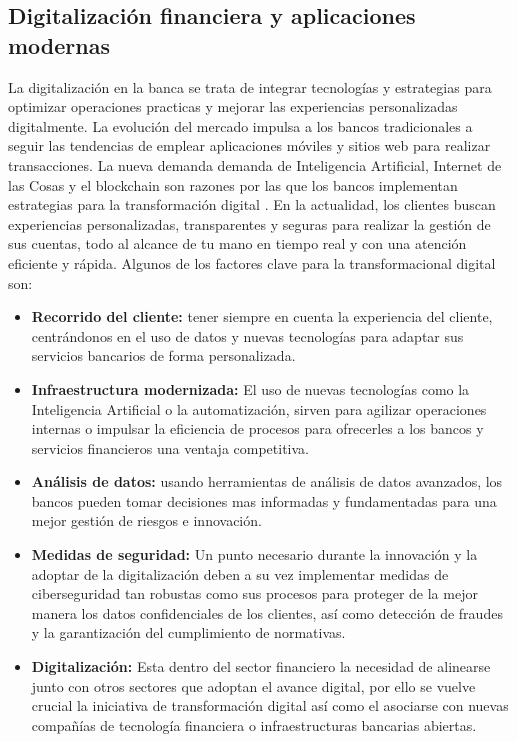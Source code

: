 \subsection{Digitalización financiera y aplicaciones modernas}
La digitalización en la banca se trata de integrar tecnologías y estrategias para optimizar operaciones practicas y mejorar las experiencias personalizadas digitalmente. 
La evolución del mercado impulsa a los bancos tradicionales a seguir las tendencias de emplear aplicaciones móviles y sitios web para realizar transacciones. La nueva 
demanda demanda de Inteligencia Artificial, Internet de las Cosas y el blockchain son razones por las que los bancos implementan estrategias para la transformación digital \cite{IBM Banca}.
En la actualidad, los clientes buscan experiencias personalizadas, transparentes y seguras para realizar la gestión de sus cuentas, todo al alcance de tu mano en tiempo 
real y con una atención eficiente y rápida.
Algunos de los factores clave para la transformacional digital son:
\begin{itemize}
    \item \textbf{Recorrido del cliente:} tener siempre en cuenta la experiencia del cliente, centrándonos en el uso de datos y nuevas tecnologías para adaptar sus servicios bancarios de forma personalizada.
    \item \textbf{Infraestructura modernizada:} El uso de nuevas tecnologías como la Inteligencia Artificial o la automatización, sirven para agilizar operaciones internas o impulsar la eficiencia de procesos para ofrecerles a los bancos y servicios financieros una ventaja competitiva.
    \item \textbf{Análisis de datos:} usando herramientas de análisis de datos avanzados, los bancos pueden tomar decisiones mas informadas y fundamentadas para una mejor gestión de riesgos e innovación.
    \item \textbf{Medidas de seguridad:} Un punto necesario durante la innovación y la adoptar de la digitalización deben a su vez implementar medidas de ciberseguridad tan robustas como sus procesos para proteger de la mejor manera los datos confidenciales de los clientes, así como detección de fraudes y la garantización del cumplimiento de normativas.
    \item \textbf{Digitalización:} Esta dentro del sector financiero la necesidad de alinearse junto con otros sectores que adoptan el avance digital, por ello se vuelve crucial la iniciativa de transformación digital así como el asociarse con nuevas compañías de tecnología financiera o infraestructuras bancarias abiertas.

\end{itemize}

